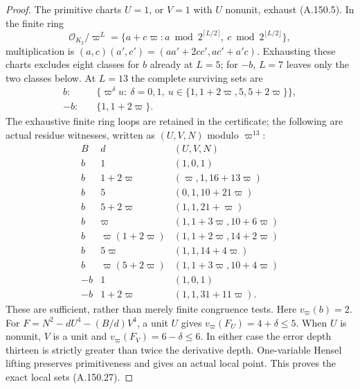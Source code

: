 \begin{proof}
The primitive charts \(U=1\), or \(V=1\) with \(U\)
nonunit, exhaust (A.150.5).
In the finite ring
\[
 \mathcal O_{K_2}/\varpi^L
   =\{a+c\varpi:
       a\bmod2^{\lceil L/2\rceil},\
       c\bmod2^{\lfloor L/2\rfloor}\},
\tag{A.150.26}
\]
multiplication is
\((a,c)(a',c')=(aa'+2cc',ac'+a'c)\).
Exhausting these charts excludes eight classes for
\(b\) already at \(L=5\); for \(-b\), \(L=7\)
leaves only the two classes below.
At \(L=13\) the complete surviving sets are
\[
 \begin{aligned}
 b:&\quad
 \{\varpi^\delta u:\ \delta=0,1,\
                 u\in\{1,1+2\varpi,5,5+2\varpi\}\},\\
 -b:&\quad \{1,1+2\varpi\}.
 \end{aligned}
\tag{A.150.27}
\]
The exhaustive finite ring loops are retained in the
certificate; the following are actual residue witnesses,
written as \((U,V,N)\) modulo \(\varpi^{13}\):
\[
 \begin{array}{c|c|c}
 B&d&(U,V,N)\\ \hline
 b&1&(1,0,1)\\
 b&1+2\varpi&(\varpi,1,16+13\varpi)\\
 b&5&(0,1,10+21\varpi)\\
 b&5+2\varpi&(1,1,21+\varpi)\\
 b&\varpi&(1,1+3\varpi,10+6\varpi)\\
 b&\varpi(1+2\varpi)&(1,1+2\varpi,14+2\varpi)\\
 b&5\varpi&(1,1,14+4\varpi)\\
 b&\varpi(5+2\varpi)&(1,1+3\varpi,10+4\varpi)\\
 -b&1&(1,0,1)\\
 -b&1+2\varpi&(1,1,31+11\varpi).
 \end{array}
\tag{A.150.28}
\]
These are sufficient, rather than merely finite
congruence tests.  Here \(v_\varpi(b)=2\).
For \(F=N^2-dU^4-(B/d)V^4\), a unit \(U\)
gives
\(v_\varpi(F_U)=4+\delta\le5\).
When \(U\) is nonunit, \(V\) is a unit and
\(v_\varpi(F_V)=6-\delta\le6\).
In either case the error depth thirteen is
strictly greater than twice the derivative depth.
One-variable Hensel lifting preserves primitiveness
and gives an actual local point.
This proves the exact local sets (A.150.27).


\end{proof}
